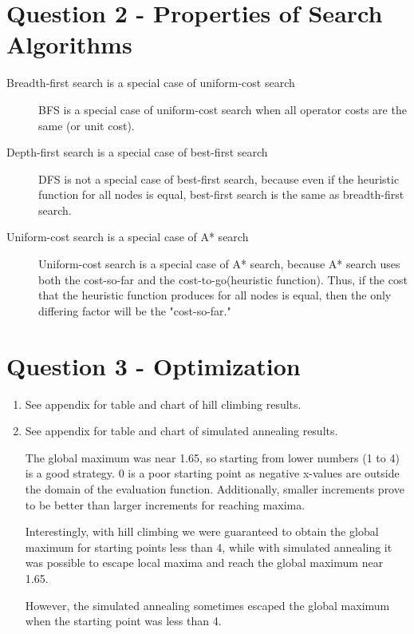 \documentclass{article}
\begin{document}
\section{Question 2 - Properties of Search Algorithms}
\begin{description}
    \item[Breadth-first search is a special case of uniform-cost search]
        BFS is a special case of uniform-cost search when all operator
        costs are the same (or unit cost).
    \item[Depth-first search is a special case of best-first search]
        DFS is not a special case of best-first search, because even
        if the heuristic function for all nodes is equal, best-first search
        is the same as breadth-first search.
    \item[Uniform-cost search is a special case of A* search]
        Uniform-cost search is a special case of A* search, because
        A* search uses both the cost-so-far and the cost-to-go(heuristic function).
        Thus, if the cost that the heuristic function produces for all nodes
        is equal, then the only differing factor will be the "cost-so-far."
\end{description}

\section{Question 3 - Optimization}
\begin{enumerate}
    \item See appendix for table and chart of hill climbing results.
    \item See appendix for table and chart of simulated annealing results.
        \par
        The global maximum was near 1.65, so starting from lower numbers (1 to 4) is a good strategy.
        0 is a poor starting point as negative x-values are outside the domain of the evaluation function.
        Additionally, smaller increments prove to be better than larger increments for reaching maxima.
        \par
        Interestingly, with hill climbing we were guaranteed to obtain the global maximum for starting points
        less than 4, while with simulated annealing it was possible to escape local maxima and
        reach the global maximum near 1.65.
        \par
        However, the simulated annealing sometimes escaped the global maximum
        when the starting point was less than 4.
\end{enumerate}
\end{document}
